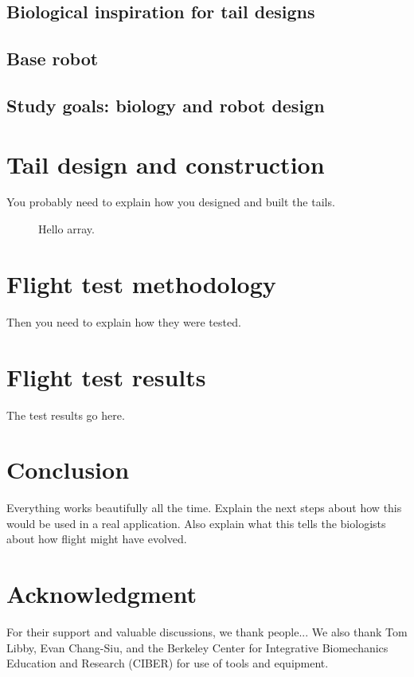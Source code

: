 \documentclass[journal]{IEEEtran}
\begin{document}
\subsection{Biological inspiration for tail designs}
\subsection{Base robot}
\subsection{Study goals: biology and robot design}

\section{Tail design and construction}
You probably need to explain how you designed and built the tails.
\begin{figure}
\caption{Hello array.}
\label{fig:intro}
\end{figure}
 
\section{Flight test methodology}
Then you need to explain how they were tested.

\section{Flight test results}
The test results go here. 

\section{Conclusion}
Everything works beautifully all the time. Explain the next steps about how this would be used in a real application. Also explain what this tells the biologists about how flight might have evolved. 




\section*{Acknowledgment}

For their support and valuable discussions, we thank people... We also thank Tom Libby, Evan Chang-Siu, and the Berkeley Center for Integrative Biomechanics Education and Research (CIBER) for use of tools and equipment.  
\end{document}
